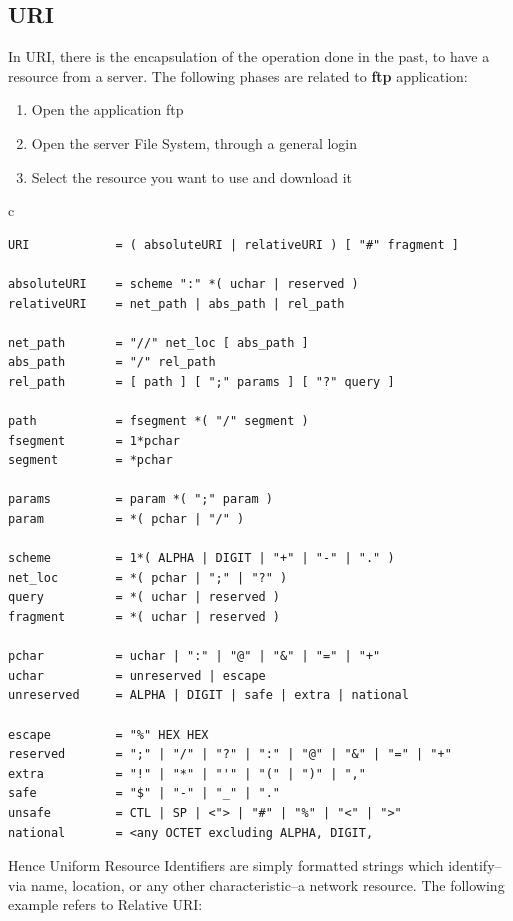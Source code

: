 \subsection{URI}
In URI, there is the encapsulation of the operation done in the past, to have a resource from a server. The following phases are related to \textbf{ftp} application:
\begin{enumerate}
\item{Open the application ftp}
\item{Open the server File System, through a general login}
\item{Select the resource you want to use and download it}
\end{enumerate}
\begin{center}
\begin{tabular}{c}
\begin{lstlisting}[linewidth=320pt, basicstyle=\footnotesize\sffamily,]
URI            = ( absoluteURI | relativeURI ) [ "#" fragment ]

absoluteURI    = scheme ":" *( uchar | reserved )
relativeURI    = net_path | abs_path | rel_path

net_path       = "//" net_loc [ abs_path ]
abs_path       = "/" rel_path
rel_path       = [ path ] [ ";" params ] [ "?" query ]

path           = fsegment *( "/" segment )
fsegment       = 1*pchar
segment        = *pchar

params         = param *( ";" param )
param          = *( pchar | "/" )

scheme         = 1*( ALPHA | DIGIT | "+" | "-" | "." )
net_loc        = *( pchar | ";" | "?" )
query          = *( uchar | reserved )
fragment       = *( uchar | reserved )

pchar          = uchar | ":" | "@" | "&" | "=" | "+"
uchar          = unreserved | escape
unreserved     = ALPHA | DIGIT | safe | extra | national

escape         = "%" HEX HEX
reserved       = ";" | "/" | "?" | ":" | "@" | "&" | "=" | "+"
extra          = "!" | "*" | "'" | "(" | ")" | ","
safe           = "$" | "-" | "_" | "."
unsafe         = CTL | SP | <"> | "#" | "%" | "<" | ">"
national       = <any OCTET excluding ALPHA, DIGIT,
\end{lstlisting}
\end{tabular}
\end{center}
Hence Uniform Resource Identifiers are simply formatted strings which identify--via name, location, or any other characteristic--a network resource. The following example refers to Relative URI:
